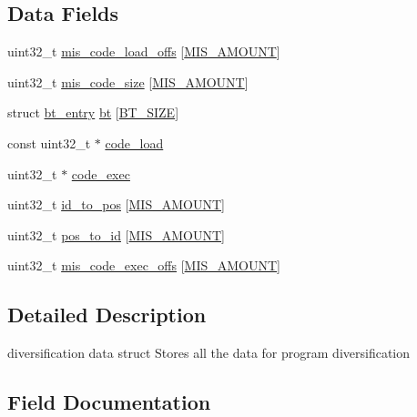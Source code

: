 \subsection*{Data Fields}
\begin{DoxyCompactItemize}
\item 
uint32\+\_\+t \hyperlink{structdiv__data_a925a744075f14451053bde1984307c2c}{mis\+\_\+code\+\_\+load\+\_\+offs} \mbox{[}\hyperlink{div__data_8h_a3132ecd423d2111501409d7956aae527}{M\+I\+S\+\_\+\+A\+M\+O\+U\+NT}\mbox{]}
\item 
uint32\+\_\+t \hyperlink{structdiv__data_a10a5d55d28a5659701b4d1df3660f693}{mis\+\_\+code\+\_\+size} \mbox{[}\hyperlink{div__data_8h_a3132ecd423d2111501409d7956aae527}{M\+I\+S\+\_\+\+A\+M\+O\+U\+NT}\mbox{]}
\item 
struct \hyperlink{structbt__entry}{bt\+\_\+entry} \hyperlink{structdiv__data_a47f872c1cea250ffe2772bd45fabc7f9}{bt} \mbox{[}\hyperlink{div__data_8h_ad92e5a361600001505e57ae60af38ce7}{B\+T\+\_\+\+S\+I\+ZE}\mbox{]}
\item 
const uint32\+\_\+t $\ast$ \hyperlink{structdiv__data_ae09e403374ca5aaaf51c962a89d4541e}{code\+\_\+load}
\item 
uint32\+\_\+t $\ast$ \hyperlink{structdiv__data_a95226056db8734cc65b8b3800203a8c8}{code\+\_\+exec}
\item 
uint32\+\_\+t \hyperlink{structdiv__data_ac090dfe9fdda3553a7f2f2a0bfc5413b}{id\+\_\+to\+\_\+pos} \mbox{[}\hyperlink{div__data_8h_a3132ecd423d2111501409d7956aae527}{M\+I\+S\+\_\+\+A\+M\+O\+U\+NT}\mbox{]}
\item 
uint32\+\_\+t \hyperlink{structdiv__data_a33056572ecaf33c72d4400f33249193d}{pos\+\_\+to\+\_\+id} \mbox{[}\hyperlink{div__data_8h_a3132ecd423d2111501409d7956aae527}{M\+I\+S\+\_\+\+A\+M\+O\+U\+NT}\mbox{]}
\item 
uint32\+\_\+t \hyperlink{structdiv__data_a2b755a737f5de109bf25f908ec6ae4bd}{mis\+\_\+code\+\_\+exec\+\_\+offs} \mbox{[}\hyperlink{div__data_8h_a3132ecd423d2111501409d7956aae527}{M\+I\+S\+\_\+\+A\+M\+O\+U\+NT}\mbox{]}
\end{DoxyCompactItemize}


\subsection{Detailed Description}
diversification data struct Stores all the data for program diversification 

\subsection{Field Documentation}
\mbox{\label{structdiv__data_a47f872c1cea250ffe2772bd45fabc7f9}} 
